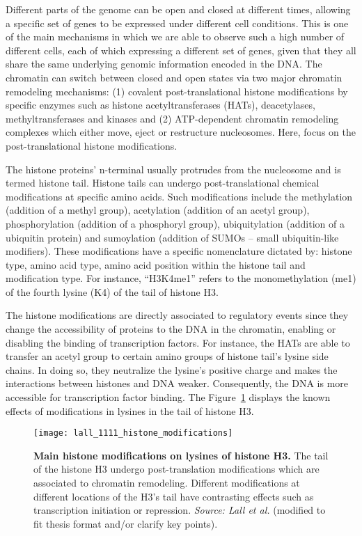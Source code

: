Different parts of the genome can be open and closed at different times, allowing a specific set of genes to be expressed under different cell conditions. This is one of the main mechanisms in which we are able to observe such a high number of different cells, each of which expressing a different set of genes, given that they all share the same underlying genomic information encoded in the DNA. The chromatin can switch between closed and open states via two major chromatin remodeling mechanisms: (1) covalent post-translational histone modifications by specific enzymes such as histone acetyltransferases (HATs), deacetylases, methyltransferases and kinases and (2) ATP-dependent chromatin remodeling complexes which either move, eject or restructure nucleosomes. Here, focus on the post-translational histone modifications.

The histone proteins' n-terminal usually protrudes from the nucleosome and is termed histone tail. Histone tails can undergo post-translational chemical modifications at specific amino acids. Such modifications include the methylation (addition of a methyl group), acetylation (addition of an acetyl group), phosphorylation (addition of a phosphoryl group), ubiquitylation (addition of a ubiquitin protein) and sumoylation (addition of SUMOs -- small ubiquitin-like modifiers). These modifications have a specific nomenclature dictated by: histone type, amino acid type, amino acid position within the histone tail and modification type. For instance, ``H3K4me1'' refers to the monomethylation (me1) of the fourth lysine (K4) of the tail of histone H3.

The histone modifications are directly associated to regulatory events since they change the accessibility of proteins to the DNA in the chromatin, enabling or disabling the binding of transcription factors. For instance, the HATs are able to transfer an acetyl group to certain amino groups of histone tail's lysine side chains. In doing so, they neutralize the lysine's positive charge and makes the interactions between histones and DNA weaker. Consequently, the DNA is more accessible for transcription factor binding. The Figure~\ref{fig:lall_histone_modifications} displays the known effects of modifications in lysines in the tail of histone H3.

\begin{figure}[h!]
\centering
\texttt{[image: lall\_1111\_histone\_modifications]}
\caption[Main histone modifications on lysines of histone H3]{\textbf{Main histone modifications on lysines of histone H3.} The tail of the histone H3 undergo post-translation modifications which are associated to chromatin remodeling. Different modifications at different locations of the H3's tail have contrasting effects such as transcription initiation or repression. \emph{Source: Lall et al.}\cite{lall2007} (modified to fit thesis format and/or clarify key points).}
\label{fig:lall_histone_modifications}
\end{figure}


